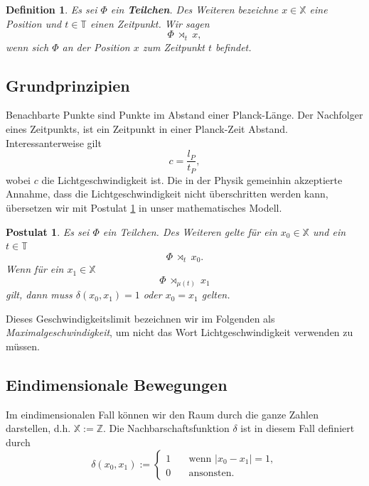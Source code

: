\documentclass[a4paper,12pt,ngerman]{scrartcl}
\theoremstyle{plain}
\newtheorem{definition}{Definition}
\theoremstyle{plain}
\theoremstyle{plain}
\newtheorem{postulate}{Postulat}
\theoremstyle{plain}
\newcommand{\Z}{\mathbb{Z}}
\newcommand{\T}{\mathbb{T}}
\newcommand{\X}{\mathbb{X}}
\newcommand{\at}[1]{\;\rtimes_{#1}\;}
\begin{document}


{
\begin{definition}
Es sei $\Phi$ ein \textbf{Teilchen}. Des Weiteren bezeichne $x\in\X$ eine Position und $t\in\T$ einen Zeitpunkt. Wir sagen
\[\Phi \at{t} x,\]
wenn sich $\Phi$ an der Position $x$ zum Zeitpunkt $t$ befindet.
\end{definition}
}

\subsection{Grundprinzipien}

Benachbarte Punkte sind Punkte im Abstand einer Planck-Länge. %
Der Nachfolger eines Zeitpunkts, ist ein Zeitpunkt in einer Planck-Zeit Abstand. Interessanterweise gilt
\[c=\frac{l_P}{t_P},\]
wobei $c$ die Lichtgeschwindigkeit ist. Die in der Physik gemeinhin akzeptierte Annahme, dass die Lichtgeschwindigkeit nicht überschritten werden kann, übersetzen wir mit Postulat \ref{pos_lightspeed} in unser mathematisches Modell.

{
\begin{postulate}\label{pos_lightspeed}
Es sei $\Phi$ ein Teilchen. Des Weiteren gelte für ein $x_0\in\X$ und ein $t\in\T$
\[\Phi \at{t} x_0.\]
Wenn für ein $x_1\in\X$ 
\[\Phi \at{\mu(t)} x_1\]
gilt, dann muss $\delta(x_0,x_1)=1$ oder $x_0=x_1$ gelten.
\end{postulate}
}

Dieses Geschwindigkeitslimit bezeichnen wir im Folgenden als \textit{Maximalgeschwindigkeit}, um nicht das Wort Lichtgeschwindigkeit verwenden zu müssen.

\subsection{Eindimensionale Bewegungen}

Im eindimensionalen Fall können wir den Raum durch die ganze Zahlen darstellen, d.h. $\X := \Z$. Die Nachbarschaftsfunktion $\delta$ ist in diesem Fall definiert durch 
\[\delta(x_0,x_1):=\begin{cases}
1 \quad&\mbox{wenn } |x_0-x_1|=1,\\
0 \quad&\mbox{ansonsten.}
\end{cases}\]
\end{document}
